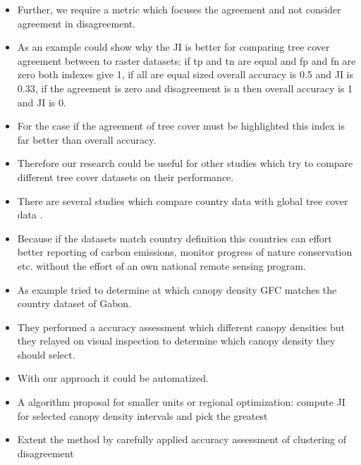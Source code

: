 \begin{itemize}
				\item Further, we require a metric which focuses the agreement and not consider agreement in disagreement.
				\item As an example could show why the \ac{JI} is better for comparing tree cover agreement between to raster datasets: if tp and tn are equal and fp and fn are zero both indexes give 1, if all are equal sized overall accuracy is 0.5 and \ac{JI} is 0.33, if the agreement is zero and disagreement is n then overall accuracy is 1 and \ac{JI} is 0.
				\item For the case if the agreement of tree cover must be highlighted this index is far better than overall accuracy.
				\item Therefore our research could be useful for other studies which try to compare different tree cover datasets on their performance.
				\item There are several studies which compare country data with global tree cover data \citep{Sannier2016,McRoberts2016,Gross2017}.
				\item Because if the datasets match country definition this countries can effort better reporting of carbon emissions, monitor progress of nature conservation etc. without the effort of an own national remote sensing program.
				\item As example \citep{Sannier2016} tried to determine at which canopy density \ac{GFC} matches the country dataset of Gabon.
				\item They performed a accuracy assessment which different canopy densities but they relayed on visual inspection to determine which canopy density they should select.
				\item With our approach it could be automatized.
				\item A algorithm proposal for smaller units or regional optimization: compute \ac{JI} for selected canopy density intervals and pick the greatest
				\item Extent the method by carefully applied accuracy assessment of clustering of disagreement 
			\end{itemize}

